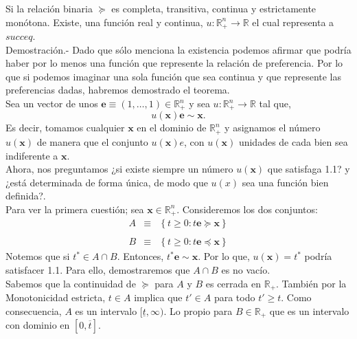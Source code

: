 \begin{teo}
    Si la relación binaria $\succeq$ es completa, transitiva, continua y estrictamente monótona. Existe, una función real y continua, $u:\mathbb{R}^n_+\to \mathbb{R}$ el cual representa a $succeq$.\\

	Demostración.-\; Dado que sólo menciona la existencia podemos afirmar que podría haber por lo menos una función que represente la relación de preferencia. Por lo que si podemos imaginar una sola función que sea continua y que represente las preferencias dadas, habremos demostrado el teorema.\\

	Sea un vector de unos $\textbf{e}\equiv(1,\ldots,1)\in \mathbb{R}^n_+$ y sea $u:\mathbb{R}^n_+\to \mathbb{R}$ tal que,
	\begin{equation}
	    u(\textbf{x})\textbf{e}\sim \textbf{x}.
	\end{equation}
	Es decir, tomamos cualquier $\textbf{x}$ en el dominio de $\mathbb{R}^n_+$ y asignamos el número $u(\textbf{x})$ de manera que el conjunto $u(\textbf{x})e$, con $u(\textbf{x})$ unidades de cada bien sea indiferente a $\textbf{x}$.\\

	Ahora, nos preguntamos ¿si existe siempre un número $u(\textbf{x})$ que satisfaga 1.1? y ¿está determinada de forma única, de modo que $u(x)$ sea una función bien definida?. \\

	Para ver la primera cuestión; sea $\textbf{x}\in \mathbb{R}^n_+$.  Consideremos los dos conjuntos:
	$$
	\begin{array}{rcl}
	    A &\equiv& \left\{t\geq 0: t\textbf{e}\succeq \textbf{x}\right\}\\\\
	    B &\equiv& \left\{t\geq 0: t\textbf{e}\preceq \textbf{x}\right\}
	\end{array}
	$$
	Notemos que si $t^*\in A\cap B$. Entonces, $t^*\textbf{e}\sim \textbf{x}$. Por lo que, $u(\textbf{x})=t^*$ podría satisfacer 1.1. Para ello, demostraremos que $A\cap B$ es no vacío. \\

	Sabemos que la continuidad de $\succeq$ para $A$ y $B$ es cerrada en $\mathbb{R}_+$. También por la Monotonicidad estricta, $t\in A$ implica que $t'\in A$ para todo $t'\geq t$. Como consecuencia, $A$ es un intervalo $[\underline{t},\infty)$. Lo propio para $B\in \mathbb{R}_+$ que es un intervalo con dominio en $[0,\overline{t}]$.\\


\end{teo}
